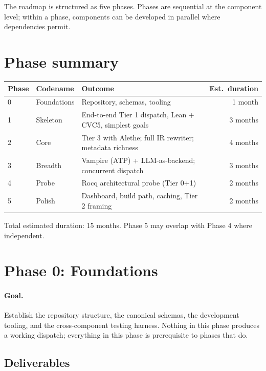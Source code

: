 \documentclass[11pt,letterpaper]{article}
\begin{document}
The roadmap is structured as five phases. Phases are sequential at the
component level; within a phase, components can be developed in
parallel where dependencies permit.

\section{Phase summary}

\begin{tabularx}{\textwidth}{@{}llXr@{}}
\toprule
\textbf{Phase} & \textbf{Codename} & \textbf{Outcome} & \textbf{Est.\ duration} \\
\midrule
0 & Foundations  & Repository, schemas, tooling                             & 1 month \\
1 & Skeleton     & End-to-end Tier 1 dispatch, Lean + CVC5, simplest goals  & 3 months \\
2 & Core         & Tier 3 with Alethe; full IR rewriter; metadata richness  & 4 months \\
3 & Breadth      & Vampire (ATP) + LLM-as-backend; concurrent dispatch       & 3 months \\
4 & Probe        & Rocq architectural probe (Tier 0+1)                      & 2 months \\
5 & Polish       & Dashboard, build path, caching, Tier 2 framing           & 2 months \\
\bottomrule
\end{tabularx}

\bigskip

Total estimated duration: 15 months. Phase 5 may overlap with Phase 4
where independent.

\section{Phase 0: Foundations}
\label{sec:phase0}

\paragraph{Goal.} Establish the repository structure, the canonical
schemas, the development tooling, and the cross-component testing
harness. Nothing in this phase produces a working dispatch; everything
in this phase is prerequisite to phases that do.

\subsection{Deliverables}
\end{document}
